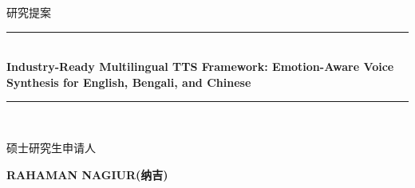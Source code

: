 \documentclass[12pt]{article}
\newcommand{\HRule}{\rule{\linewidth}{1mm}}
\begin{document}
\begin{CJK*}{UTF8}{gbsn}

\begin{titlepage}
\begin{center}
    \vspace*{2cm}

    研究提案

    \HRule \\[0.3cm]
    { \large \bfseries Industry-Ready Multilingual TTS Framework: Emotion-Aware Voice Synthesis for English, Bengali, and Chinese}\\[0.1cm] 
    \HRule \\[0.3cm]


    \large{ \bfseries \begin{CJK*}{UTF8}{gbsn}硕士研究生申请人\end{CJK*}}
    \vspace*{7cm}
    

    \begin{CJK*}{UTF8}{gbsn}
        \Huge{ \bfseries RAHAMAN NAGIUR(纳吉)}
    \end{CJK*}

    
\end{center}
\end{titlepage}


\newpage

\onehalfspacing









   



\printbibliography
\end{CJK*}
\end{document}

